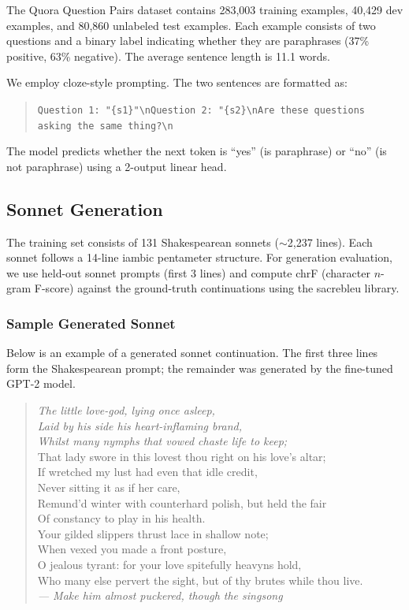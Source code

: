 \documentclass[11pt,a4paper]{article}
\begin{document}
The Quora Question Pairs dataset contains 283,003 training examples, 40,429 dev examples, and 80,860 unlabeled test examples. Each example consists of two questions and a binary label indicating whether they are paraphrases (37\% positive, 63\% negative). The average sentence length is 11.1 words.

We employ cloze-style prompting. The two sentences are formatted as:
\begin{quote}
\small\texttt{Question 1: "\{s1\}"\textbackslash nQuestion 2: "\{s2\}\textbackslash nAre these questions asking the same thing?\textbackslash n}
\end{quote}
The model predicts whether the next token is ``yes'' (is paraphrase) or ``no'' (is not paraphrase) using a 2-output linear head.

\subsection{Sonnet Generation}

The training set consists of 131 Shakespearean sonnets ($\sim$2,237 lines). Each sonnet follows a 14-line iambic pentameter structure. For generation evaluation, we use held-out sonnet prompts (first 3 lines) and compute chrF (character $n$-gram F-score) against the ground-truth continuations using the sacrebleu library.

\subsubsection{Sample Generated Sonnet}

Below is an example of a generated sonnet continuation. The first three lines form the Shakespearean prompt; the remainder was generated by the fine-tuned GPT-2 model.

\begin{quote}\small
\textit{The little love-god, lying once asleep,\\
Laid by his side his heart-inflaming brand,\\
Whilst many nymphs that vowed chaste life to keep;}\\[4pt]
That lady swore in this lovest thou right on his love's altar;\\
If wretched my lust had even that idle credit,\\
Never sitting it as if her care,\\
Remund'd winter with counterhard polish, but held the fair\\
Of constancy to play in his health.\\
Your gilded slippers thrust lace in shallow note;\\
When vexed you made a front posture,\\
O jealous tyrant: for your love spitefully heavyns hold,\\
Who many else pervert the sight, but of thy brutes while thou live.\\
\textit{--- Make him almost puckered, though the singsong}
\end{quote}
\end{document}
